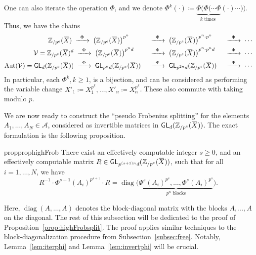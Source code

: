 \documentclass[letterpaper, 11pt, thm-restate]{article}
\numberwithin{equation}{section}
\newcommand{\Zpe}{\mathbb{Z}_{/p^e}}
\newcommand{\GL}{\mathsf{GL}}
\newcommand{\diag}{\operatorname{diag}}
\newcommand{\Aut}{\operatorname{Aut}}
\newcommand{\mV}{\mathcal{V}}
\newcommand{\mA}{\mathcal{A}}
\newcommand{\oX}{\mkern 1.5mu\overline{\mkern-1.5mu X \mkern-1.5mu}\mkern 1.5mu}
\theoremstyle{definition}
\theoremstyle{definition}
\theoremstyle{definition}
\begin{document}
One can also iterate the operation $\Phi$, and we denote $\Phi^k(\cdot) \coloneqq \underbrace{\Phi(\Phi( \cdots \Phi}_{k \text{ times }} ( \cdot ) \cdots ))$.
Thus, we have the chains
\begin{alignat*}{3}
     \Zpe(\oX) \; & \xrightarrow{\;\;\Phi\;\;} \;\left(\Zpe(\oX)\right)^{p^n} && \;\xrightarrow{\;\;\Phi\;\;}\; \left(\Zpe(\oX)\right)^{p^n \cdot p^n} && \;\xrightarrow{\;\;\Phi\;\;}\; \cdots \\
     \mV = \Zpe(\oX)^d & \;\xrightarrow{\;\;\Phi\;\;}\; \left(\Zpe(\oX)\right)^{p^n d} && \;\xrightarrow{\;\;\Phi\;\;}\; \left(\Zpe(\oX)\right)^{p^n \cdot p^nd} && \;\xrightarrow{\;\;\Phi\;\;}\; \cdots \\
     \Aut(\mV) = \GL_d(\Zpe(\oX)) & \;\xrightarrow{\;\;\Phi\;\;}\; \GL_{p^n d}(\Zpe(\oX)) && \;\xrightarrow{\;\;\Phi\;\;}\; \GL_{p^{2n} d}(\Zpe(\oX)) && \;\xrightarrow{\;\;\Phi\;\;}\; \cdots \\
\end{alignat*}
In particular, each $\Phi^k, k \geq 1$, is a bijection, and can be considered as performing the variable change $X'_1 \coloneqq X_1^{p^k}, \ldots, X'_n \coloneqq X_n^{p^k}$.
These also commute with taking modulo $p$.

We are now ready to construct the ``pseudo Frobenius splitting'' for the elements $A_1, \ldots, A_N \in \mA$, considered as invertible matrices in $\GL_d(\Zpe(\oX))$.
The exact formulation is the following proposition.

\begin{restatable}{prop}{prophighFrob}\label{prop:highFrobsplit}
    There exist an effectively computable integer $s \geq 0$, and an effectively computable matrix $R \in \GL_{p^{(s+1)n} d}(\Zpe(\oX))$, such that for all $i = 1, \ldots, N$, we have
    \begin{equation}\label{eq:highFrob}
    R^{-1} \cdot \Phi^{s+1}(A_i)^{p^{s+1}} \cdot R = \diag\Big(\underbrace{\Phi^{s}(A_i)^{p^{s}}, \ldots, \Phi^{s}(A_i)^{p^{s}}}_{p^n \text{ blocks}}\Big).
    \end{equation}
\end{restatable}

Here, $\diag(A, \ldots, A)$ denotes the block-diagonal matrix with the blocks $A, \ldots, A$ on the diagonal.
The rest of this subsection will be dedicated to the proof of Proposition~\ref{prop:highFrobsplit}.
The proof applies similar techniques to the block-diagonalization procedure from Subsection~\ref{subsec:free}.
Notably, Lemma~\ref{lem:iterphi} and Lemma~\ref{lem:invertphi} will be crucial.
\end{document}
